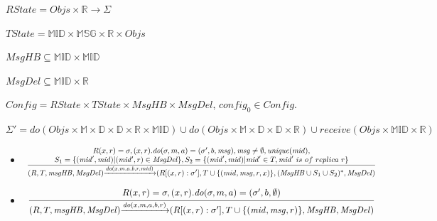 \begin{figure}[ht]
$\mathit{RState} = \mathit{Objs} \times \mathbb{R} \rightarrow \Sigma$

$\mathit{TState} = \mathbb{MID} \times \mathbb{MSG} \times \mathbb{R} \times \mathit{Objs}$

$\mathit{MsgHB} \subseteq \mathbb{MID} \times \mathbb{MID}$

$\mathit{MsgDel} \subseteq \mathbb{MID} \times \mathbb{R}$

$\mathit{Config} = \mathit{RState} \times \mathit{TState} \times \mathit{MsgHB} \times \mathit{MsgDel}$, $\mathit{config}_0 \in \mathit{Config}$.

$\Sigma' = \mathit{do}(\mathit{Objs} \times \mathbb{M} \times \mathbb{D} \times \mathbb{D} \times \mathbb{R} \times \mathbb{MID}) \cup \mathit{do}(\mathit{Objs} \times \mathbb{M} \times \mathbb{D} \times \mathbb{D} \times \mathbb{R}) \cup \mathit{receive}(\mathit{Objs} \times \mathbb{MID} \times \mathbb{R})$

\begin{itemize}
\setlength{\itemsep}{0.5pt}
\item[] $\begin{array}{l c}
   \bigfrac{
   \begin{array}{c}
     R(x,r) = \sigma, (x,r).\mathit{do}(\sigma,m,a) = (\sigma',b,\mathit{msg}), \mathit{msg} \neq \emptyset, \mathit{unique}(\mathit{mid}), \\
     S_1 = \{ (\mathit{mid}',\mathit{mid}) \vert (\mathit{mid'},r) \in \mathit{MsgDel} \}, S_2 = \{ (\mathit{mid}',\mathit{mid}) \vert \mathit{mid}' \in T, \mathit{mid}' \ is \ of \ replica \ r \}
   \end{array}}
     {(R,T,\mathit{msgHB},\mathit{MsgDel}) {\xrightarrow{\mathit{do}(x,m,a,b,r,\mathit{mid})}} (R[(x,r):\sigma'], T \cup \{ (\mathit{mid},\mathit{msg},r,x) \}, (\mathit{MsgHB} \cup S_1 \cup S_2)^*,\mathit{MsgDel})}
\end{array}$

\item[] $\begin{array}{l c}
   \bigfrac{
   \begin{array}{c}
     R(x,r) = \sigma, (x,r).\mathit{do}(\sigma,m,a) = (\sigma',b,\emptyset)
   \end{array}}
     {(R,T,\mathit{msgHB},\mathit{MsgDel}) {\xrightarrow{\mathit{do}(x,m,a,b,r)}} (R[(x,r):\sigma'], T \cup \{ (\mathit{mid},\mathit{msg},r) \}, \mathit{MsgHB},\mathit{MsgDel})}
\end{array}$


\end{itemize}
\end{figure}
